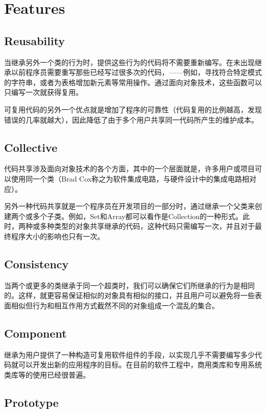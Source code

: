 \chapter{Features}

\section{Reusability}


当继承另外一个类的行为时，提供这些行为的代码将不需要重新编写。在未出现继承以前程序员需要重写那些已经写过很多次的代码，——例如，寻找符合特定模式的字符串，或者为表格增加新元素等常用操作。通过面向对象技术，这些函数可以只编写一次就获得复用。

可复用代码的另外一个优点就是增加了程序的可靠性（代码复用的比例越高，发现错误的几率就越大），因此降低了由于多个用户共享同一代码所产生的维护成本。

\section{Collective}

代码共享涉及面向对象技术的各个方面，其中的一个层面就是，许多用户或项目可以使用同一个类（Brad Cox称之为软件集成电路，与硬件设计中的集成电路相对应）。

另外一种代码共享就是一个程序员在开发项目的一部分时，通过继承一个父类来创建两个或多个子类。例如，Set和Array都可以看作是Collection的一种形式。此时，两种或多种类型的对象共享继承的代码，这种代码只需编写一次，并且对于最终程序大小的影响也只有一次。


\section{Consistency}

当两个或更多的类继承于同一个超类时，我们可以确保它们所继承的行为是相同的。这样，就更容易保证相似的对象具有相似的接口，并且用户可以避免将一些表面相似但行为和相互作用方式截然不同的对象组成一个混乱的集合。


\section{Component}

继承为用户提供了一种构造可复用软件组件的手段，以实现几乎不需要编写多少代码就可以开发出新的应用程序的目标。在目前的软件工程中，商用类库和专用系统类库等的使用已经很普遍。

\section{Prototype}

